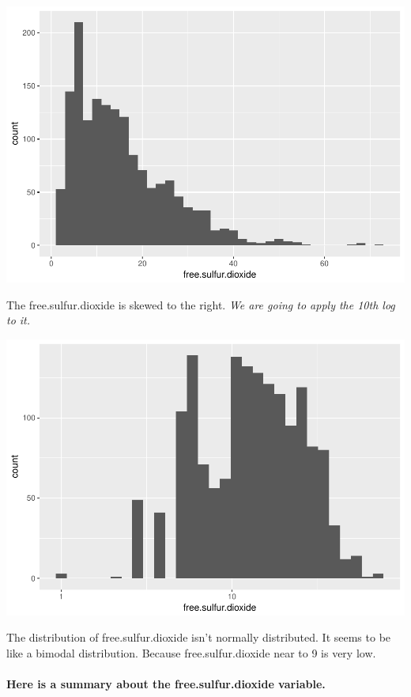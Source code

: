 \documentclass[]{article}
\let\oldparagraph\paragraph
\renewcommand{\paragraph}[1]{\oldparagraph{#1}\mbox{}}
\begin{document}
\includegraphics{RedWine_files/figure-latex/Make_Plot_Function_For_free.sulfur.dioxide-1.pdf}

The free.sulfur.dioxide is skewed to the right. \emph{We are going to
apply the 10th log to it.}

\includegraphics{RedWine_files/figure-latex/Make_Plot_Function_For_free.sulfur.dioxide_log10-1.pdf}

The distribution of free.sulfur.dioxide isn't normally distributed. It
seems to be like a bimodal distribution. Because free.sulfur.dioxide
near to 9 is very low.

\paragraph{Here is a summary about the free.sulfur.dioxide
variable.}\label{here-is-a-summary-about-the-free.sulfur.dioxide-variable.}
\end{document}
